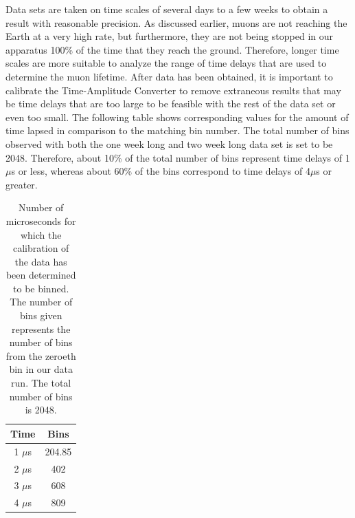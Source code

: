 Data sets are taken on time scales of several days to a few weeks to obtain a result with reasonable precision. As discussed earlier, muons are not reaching the Earth at a very high rate, but furthermore, they are not being stopped in our apparatus 100\% of the time that they reach the ground. Therefore, longer time scales are more suitable to analyze the range of time delays that are used to determine the muon lifetime. After data has been obtained, it is important to calibrate the Time-Amplitude Converter to remove extraneous results that may be time delays that are too large to be feasible with the rest of the data set or even too small. The following table shows corresponding values for the amount of time lapsed in comparison to the matching bin number. The total number of bins observed with both the one week long and two week long data set is set to be 2048. Therefore, about 10\% of the total number of bins represent time delays of 1$\mu$s or less, whereas about 60\% of the bins correspond to time delays of 4$\mu$s or greater. 
\begin{table}[h]
\begin{center}
\begin{tabular}{|c|c|}\hline
Time & Bins\\ \hline
1 $\mu$s & 204.85\\ \hline
2 $\mu$s & 402 \\ \hline
3 $\mu$s & 608 \\ \hline
4 $\mu$s & 809 \\ \hline
\end{tabular}
\caption{Number of microseconds for which the calibration of the data has been determined to be binned. The number of bins given represents the number of bins from the zeroeth bin in our data run. The total number of bins  is 2048.}
\end{center}
\end{table}



